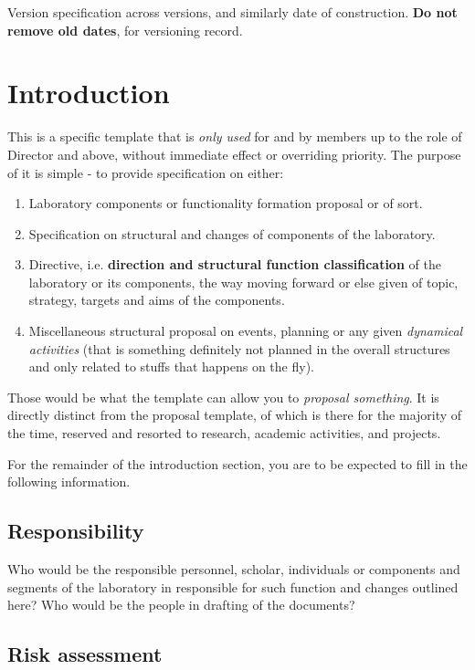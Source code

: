 \documentclass[10pt,a4paper]{article}
\begin{document}
Version specification across versions, and similarly date of construction. \textbf{Do not remove old dates}, for versioning record. 

\section{Introduction}

This is a specific template that is \textit{only used} for and by members up to the role of Director and above, without immediate effect or overriding priority. The purpose of it is simple - to provide specification on either: 
\begin{enumerate}
    \item Laboratory components or functionality formation proposal or of sort. 
    \item Specification on structural and changes of components of the laboratory. 
    \item Directive, i.e. \textbf{direction and structural function classification} of the laboratory or its components, the way moving forward or else given of topic, strategy, targets and aims of the components. 
    \item Miscellaneous structural proposal on events, planning or any given \textit{dynamical activities} (that is something definitely not planned in the overall structures and only related to stuffs that happens on the fly). 
\end{enumerate}
Those would be what the template can allow you to \textit{proposal something}. It is directly distinct from the proposal template, of which is there for the majority of the time, reserved and resorted to research, academic activities, and projects. 

For the remainder of the introduction section, you are to be expected to fill in the following information.

\subsection{Responsibility}

Who would be the responsible personnel, scholar, individuals or components and segments of the laboratory in responsible for such function and changes outlined here? Who would be the people in drafting of the documents? 

\subsection{Risk assessment}
\end{document}
